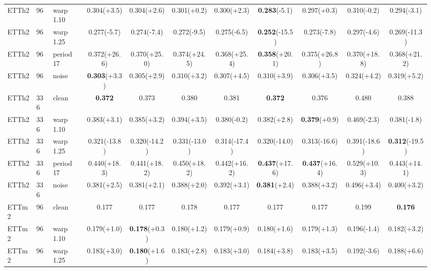 \begin{tabular}{lllcccccccc}
ETTh2 & 96 & warp 1.10 & 0.304\tiny{(+3.5)} & 0.304\tiny{(+2.6)} & 0.301\tiny{(+0.2)} & 0.300\tiny{(+2.3)} & \textbf{0.283}\tiny{(-5.1)} & 0.297\tiny{(+0.3)} & 0.310\tiny{(-0.2)} & 0.294\tiny{(-3.1)} \\
ETTh2 & 96 & warp 1.25 & 0.277\tiny{(-5.7)} & 0.274\tiny{(-7.4)} & 0.272\tiny{(-9.5)} & 0.275\tiny{(-6.5)} & \textbf{0.252}\tiny{(-15.5)} & 0.273\tiny{(-7.8)} & 0.297\tiny{(-4.6)} & 0.269\tiny{(-11.3)} \\
ETTh2 & 96 & period 17 & 0.372\tiny{(+26.6)} & 0.370\tiny{(+25.0)} & 0.374\tiny{(+24.5)} & 0.368\tiny{(+25.4)} & \textbf{0.358}\tiny{(+20.1)} & 0.375\tiny{(+26.8)} & 0.370\tiny{(+18.8)} & 0.368\tiny{(+21.2)} \\
ETTh2 & 96 & noise & \textbf{0.303}\tiny{(+3.3)} & 0.305\tiny{(+2.9)} & 0.310\tiny{(+3.2)} & 0.307\tiny{(+4.5)} & 0.310\tiny{(+3.9)} & 0.306\tiny{(+3.5)} & 0.324\tiny{(+4.2)} & 0.319\tiny{(+5.2)} \\
\midrule
ETTh2 & 336 & clean & \textbf{0.372} & 0.373 & 0.380 & 0.381 & \textbf{0.372} & 0.376 & 0.480 & 0.388 \\
ETTh2 & 336 & warp 1.10 & 0.383\tiny{(+3.1)} & 0.385\tiny{(+3.2)} & 0.394\tiny{(+3.5)} & 0.380\tiny{(-0.2)} & 0.382\tiny{(+2.8)} & \textbf{0.379}\tiny{(+0.9)} & 0.469\tiny{(-2.3)} & 0.381\tiny{(-1.8)} \\
ETTh2 & 336 & warp 1.25 & 0.321\tiny{(-13.8)} & 0.320\tiny{(-14.2)} & 0.331\tiny{(-13.0)} & 0.314\tiny{(-17.4)} & 0.320\tiny{(-14.0)} & 0.313\tiny{(-16.6)} & 0.391\tiny{(-18.6)} & \textbf{0.312}\tiny{(-19.5)} \\
ETTh2 & 336 & period 17 & 0.440\tiny{(+18.3)} & 0.441\tiny{(+18.2)} & 0.450\tiny{(+18.2)} & 0.442\tiny{(+16.2)} & \textbf{0.437}\tiny{(+17.6)} & \textbf{0.437}\tiny{(+16.4)} & 0.529\tiny{(+10.3)} & 0.443\tiny{(+14.1)} \\
ETTh2 & 336 & noise & 0.381\tiny{(+2.5)} & 0.381\tiny{(+2.1)} & 0.388\tiny{(+2.0)} & 0.392\tiny{(+3.1)} & \textbf{0.381}\tiny{(+2.4)} & 0.388\tiny{(+3.2)} & 0.496\tiny{(+3.4)} & 0.400\tiny{(+3.2)} \\
\midrule
ETTm2 & 96 & clean & 0.177 & 0.177 & 0.178 & 0.177 & 0.177 & 0.177 & 0.199 & \textbf{0.176} \\
ETTm2 & 96 & warp 1.10 & 0.179\tiny{(+1.0)} & \textbf{0.178}\tiny{(+0.3)} & 0.180\tiny{(+1.2)} & 0.179\tiny{(+0.9)} & 0.180\tiny{(+1.6)} & 0.179\tiny{(+1.3)} & 0.196\tiny{(-1.4)} & 0.182\tiny{(+3.2)} \\
ETTm2 & 96 & warp 1.25 & 0.183\tiny{(+3.0)} & \textbf{0.180}\tiny{(+1.6)} & 0.183\tiny{(+2.8)} & 0.183\tiny{(+3.0)} & 0.184\tiny{(+3.8)} & 0.183\tiny{(+3.5)} & 0.192\tiny{(-3.6)} & 0.188\tiny{(+6.6)} \\

\end{tabular}
